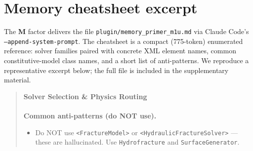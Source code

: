 \documentclass{article}
\begin{document}
\section{Memory cheatsheet excerpt}
\label{app:results}
\label{app:cheatsheet}

The \textbf{M} factor delivers the file \texttt{plugin/memory\_primer\_m1u.md} via Claude Code's \texttt{--append-system-prompt}. The cheatsheet is a compact (775-token) enumerated reference: solver families paired with concrete XML element names, common constitutive-model class names, and a short list of anti-patterns. We reproduce a representative excerpt below; the full file is included in the supplementary material.

\begin{quote}\small
\textbf{Solver Selection \& Physics Routing}\\[2pt]
\noindent{}
\\[6pt]
\textbf{Common anti-patterns (do NOT use).}\\
\begin{itemize}
\item Do NOT use \texttt{<FractureModel>} or \texttt{<HydraulicFractureSolver>} --- these are hallucinated. Use \texttt{Hydrofracture} and \texttt{SurfaceGenerator}.

\end{itemize}
\end{quote}
\end{document}
